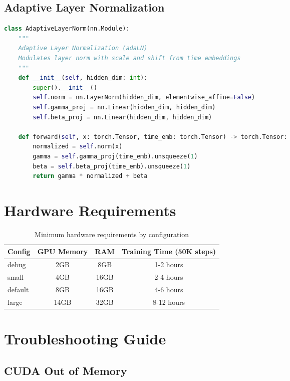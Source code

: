 \documentclass[11pt,a4paper]{article}
\begin{document}
\subsection{Adaptive Layer Normalization}

\begin{lstlisting}[language=Python]
class AdaptiveLayerNorm(nn.Module):
    """
    Adaptive Layer Normalization (adaLN)
    Modulates layer norm with scale and shift from time embeddings
    """
    def __init__(self, hidden_dim: int):
        super().__init__()
        self.norm = nn.LayerNorm(hidden_dim, elementwise_affine=False)
        self.gamma_proj = nn.Linear(hidden_dim, hidden_dim)
        self.beta_proj = nn.Linear(hidden_dim, hidden_dim)
        
    def forward(self, x: torch.Tensor, time_emb: torch.Tensor) -> torch.Tensor:
        normalized = self.norm(x)
        gamma = self.gamma_proj(time_emb).unsqueeze(1)
        beta = self.beta_proj(time_emb).unsqueeze(1)
        return gamma * normalized + beta
\end{lstlisting}

\section{Hardware Requirements}

\begin{table}[H]
\centering
\caption{Minimum hardware requirements by configuration}
\begin{tabular}{lccc}
\toprule
\textbf{Config} & \textbf{GPU Memory} & \textbf{RAM} & \textbf{Training Time (50K steps)} \\
\midrule
debug & 2GB & 8GB & 1-2 hours \\
small & 4GB & 16GB & 2-4 hours \\
default & 8GB & 16GB & 4-6 hours \\
large & 14GB & 32GB & 8-12 hours \\
\bottomrule
\end{tabular}
\label{tab:hardware}
\end{table}

\section{Troubleshooting Guide}

\subsection{CUDA Out of Memory}
\end{document}
